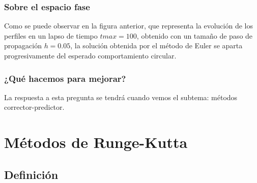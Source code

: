 \documentclass[12pt]{beamer}
\begin{document}
\begin{frame}
\frametitle{Sobre el espacio fase}
Como se puede observar en la figura anterior, que representa la evolución de los perfiles en un lapso de tiempo $tmax = 100$, obtenido con un tamaño de paso de propagación $h = 0.05$, la solución obtenida por el método de Euler se aparta progresivamente del esperado comportamiento circular.
\end{frame}
\begin{frame}
\frametitle{¿Qué hacemos para mejorar?}
La respuesta a esta pregunta se tendrá cuando vemos el subtema: \pause \textcolor{ao}{métodos corrector-predictor}.
\end{frame}

\section{Métodos de Runge-Kutta}
\subsection{Definición}
\end{document}
